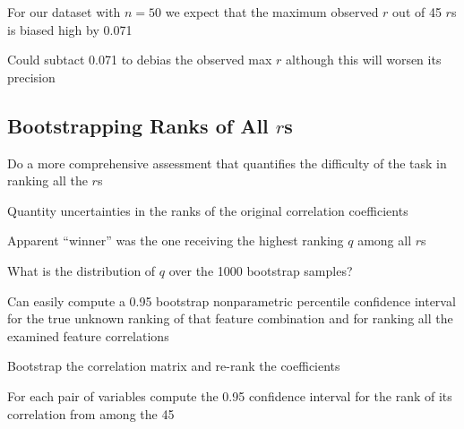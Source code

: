\item For our dataset with $n=50$ we expect that the maximum observed $r$ out of 45 $r$s is biased high by 0.071
 \bi
 \item Could subtact 0.071 to debias the observed max $r$ although this will worsen its precision
 \ei
\ei

\subsection{Bootstrapping Ranks of All $r$s}
\bi
\item Do a more comprehensive assessment that quantifies the difficulty of the task in ranking all the $r$s
\item Quantity uncertainties in the ranks of the original correlation coefficients
\item Apparent ``winner'' was the one receiving the highest ranking
  $q$ among all $r$s
\item What is the distribution of $q$ over the 1000 bootstrap samples?
\item Can easily compute a 0.95 bootstrap nonparametric percentile confidence interval for the true unknown ranking of that feature combination and for ranking all the examined feature correlations
\item Bootstrap the correlation matrix and re-rank the coefficients
\item For each pair of variables compute the 0.95 confidence interval for the rank of its correlation from among the 45

